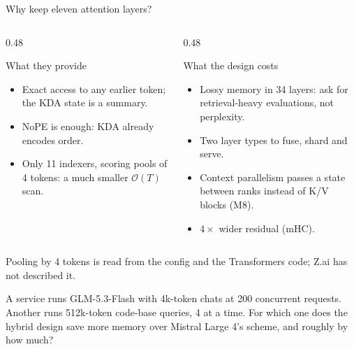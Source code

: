 \documentclass[handout]{beamer}
\begin{document}
\begin{frame}{Why keep eleven attention layers?}
  \begin{columns}[t]
    \begin{column}{0.48\linewidth}
      \begin{block}{What they provide}
        \small
        \begin{itemize}
            \setlength{\itemsep}{3pt}
          \item Exact access to any earlier token; the KDA state is a summary.
          \item NoPE is enough: KDA already encodes order.
          \item Only 11 indexers, scoring pools of 4 tokens: a much smaller $\mathcal{O}(T)$ scan.
        \end{itemize}
      \end{block}
    \end{column}
    \begin{column}{0.48\linewidth}
      \begin{alertblock}{What the design costs}
        \small
        \begin{itemize}
            \setlength{\itemsep}{3pt}
          \item Lossy memory in 34 layers: ask for retrieval-heavy evaluations, not perplexity.
          \item Two layer types to fuse, shard and serve.
          \item Context parallelism passes a state between ranks instead of K/V blocks (M8).
          \item $4\times$ wider residual (mHC).
        \end{itemize}
      \end{alertblock}
    \end{column}
  \end{columns}
  \vfill
  \footnotesize\textcolor{inkmuted}{Pooling by 4 tokens is read from the config and the Transformers code; Z.ai has not described it.}
\end{frame}

{A service runs GLM-5.3-Flash with 4k-token chats at 200 concurrent requests. Another runs 512k-token code-base queries, 4 at a time. For which one does the hybrid design save more memory over Mistral Large 4's scheme, and roughly by how much?}
\end{document}
